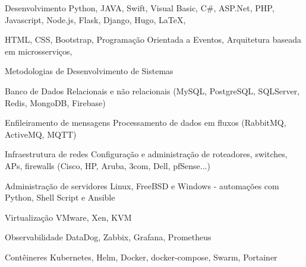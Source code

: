 

\begin{cvskills}

\cvskill
    {Desenvolvimento} %
    {Python, JAVA, Swift, Visual Basic, C\#, ASP.Net, PHP, Javascript, Node.js, Flask, Django, Hugo, LaTeX,} %

\cvskill
    {} %
    {HTML, CSS, Bootstrap, Programação Orientada a Eventos, Arquitetura baseada em microsserviços, } %

\cvskill
    {} %
    {Metodologias de Desenvolvimento de Sistemas} %



\cvskill
    {Banco de Dados} %
    {Relacionais e não relacionais (MySQL, PostgreSQL, SQLServer, Redis, MongoDB, Firebase)} %


\cvskill
    {Enfileiramento de mensagens} %
    {Processamento de dados em fluxos (RabbitMQ, ActiveMQ, MQTT)} %

\cvskill
    {Infraestrutura de redes} %
    {Configuração e administração de roteadores, switches, APs, firewalls (Cisco, HP, Aruba, 3com, Dell, pfSense...)} %

\cvskill
    {Administração de servidores} %
    {Linux, FreeBSD e Windows - automações com Python, Shell Script e Ansible} %

\cvskill
    {Virtualização} %
    {VMware, Xen, KVM} %

\cvskill
    {Observabilidade} %
    {DataDog, Zabbix, Grafana, Prometheus} %


\cvskill
    {Contêineres} %
    {Kubernetes, Helm, Docker, docker-compose, Swarm, Portainer} %


\end{cvskills}
